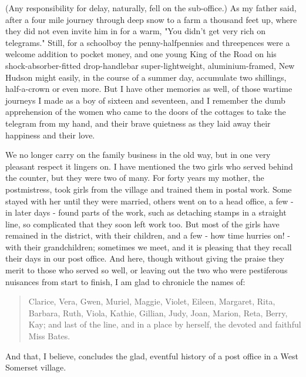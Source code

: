 (Any responsibility for delay, naturally, fell on the sub-office.) As my father said, after a four mile journey through deep snow to a farm a thousand feet up, where they did not even invite him in for a warm, "You didn't get very rich on telegrams." Still, for a schoolboy the penny-halfpennies and threepences were a welcome addition to pocket money, and one young King of the Road on his shock-absorber-fitted drop-handlebar super-lightweight, aluminium-framed, New Hudson might easily, in the course of a summer day, accumulate two shillings, half-a-crown or even more. But I have other memories as well, of those wartime journeys I made as a boy of sixteen and seventeen, and I remember the dumb apprehension of the women who came to the doors of the cottages to take the telegram from my hand, and their brave quietness as they laid away their happiness and their love.

We no longer carry on the family business in the old way, but in one very pleasant respect it lingers on. I have mentioned the two girls who served behind the counter, but they were two of many. For forty years my mother, the postmistress, took girls from the village and trained them in postal work. Some stayed with her until they were married, others went on to a head office, a few - in later days - found parts of the work, such as detaching stamps in a straight line, so complicated that they soon left work too. But most of the girls have remained in the district, with their children, and a few - how time hurries on! - with their grandchildren; sometimes we meet, and it is pleasing that they recall their days in our post office. And here, though without giving the praise they merit to those who served so well, or leaving out the two who were pestiferous nuisances from start to finish, I am glad to chronicle the names of:

\begin{quote}
Clarice, Vera, Gwen, Muriel, Maggie, Violet, Eileen, Margaret, Rita, Barbara, Ruth, Viola, Kathie, Gillian, Judy, Joan, Marion, Reta, Berry, Kay;
and last of the line, and in a place by herself, the devoted and faithful Miss Bates.
\end{quote}

And that, I believe, concludes the glad, eventful history of a post office in a West Somerset village.
